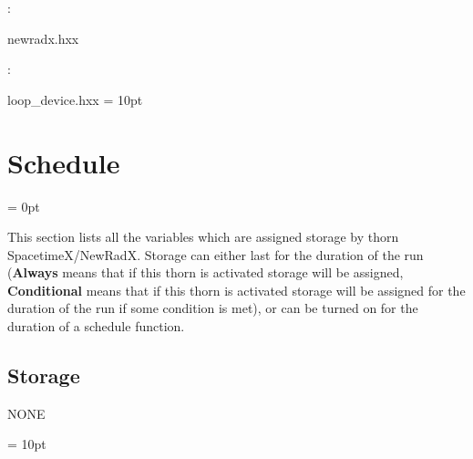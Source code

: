 : 



newradx.hxx
\vspace{2mm}

: 

loop\_device.hxx
\vspace{2mm}\parskip = 10pt 

\section{Schedule} 


\parskip = 0pt


\noindent This section lists all the variables which are assigned storage by thorn SpacetimeX/NewRadX.  Storage can either last for the duration of the run ({\bf Always} means that if this thorn is activated storage will be assigned, {\bf Conditional} means that if this thorn is activated storage will be assigned for the duration of the run if some condition is met), or can be turned on for the duration of a schedule function.


\subsection*{Storage}NONE

\vspace{5mm}\parskip = 10pt 

